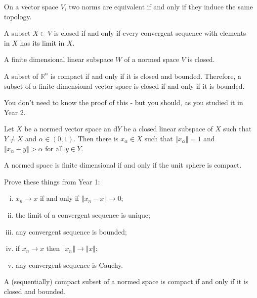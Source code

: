 \documentclass[a4paper]{article}
\newcommand{\R}{\mathbb{R}}
\newcommand{\norm}[1]{\left\Vert #1 \right\Vert}
\newcommand{\<}{\langle}
\renewcommand{\>}{\rangle}
\renewcommand{\a}{\alpha}
\begin{document}
\begin{prop}
  On a vector space $V$, two norms are equivalent if and only if they induce the same topology.
\end{prop}

\begin{lemma}
  A subset $X\subset V$ is closed if and only if every convergent sequence with elements in $X$ has its limit in $X$.
\end{lemma}

\begin{prop}
  A finite dimensional linear subspace $W$ of a normed space $V$ is closed.
\end{prop}

\begin{thm}
  A subset of $\R^n$ is compact if and only if it is closed and bounded. Therefore, a subset of a finite-dimensional vector space is closed if and only if it is bounded.
\end{thm}

You don't need to know the proof of this - but you should, as you studied it in Year 2.

\begin{lemma}
  Let $X$ be a normed vector space an d$Y$ be a closed linear subspace of $X$ such that $Y\neq X$ and $\a\in(0,1)$. Then there is $x_\a\in X$ such that $\norm{x_\a}=1$ and $\norm{x_\a-y}>\a$ for all $y\in Y$.
\end{lemma}

\begin{thm}
  A normed space is finite dimensional if and only if the unit sphere is compact.
\end{thm}

\begin{ex} Prove these things from Year 1:
  \begin{enumerate}[(i)]
    \item $x_n\to x$ if and only if $\norm{x_n-x}\to0$;
    \item the limit of a convergent sequence is unique;
    \item any convergent sequence is bounded;
    \item if $x_n\to x$ then $\norm{x_n}\to\norm{x}$;
    \item any convergent sequence is Cauchy.
  \end{enumerate}
\end{ex}

\begin{ex}
  A (sequentially) compact subset of a normed space is compact if and only if it is closed and bounded.
\end{ex}
\end{document}
